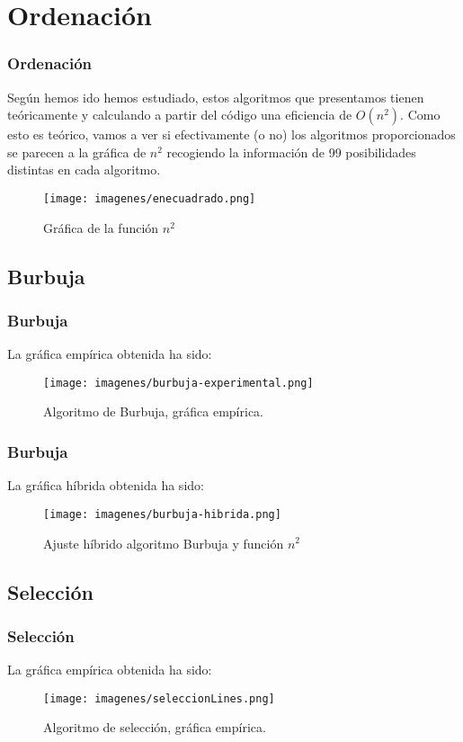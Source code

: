 \documentclass{beamer}
\begin{document}
\section{Ordenación} %
\begin{frame}
	\frametitle{Ordenación}
	Según hemos ido hemos estudiado, estos algoritmos que presentamos tienen teóricamente y calculando a partir del código una eficiencia de $O(n^2 )$. Como esto es teórico, vamos a ver si efectivamente (o no) los algoritmos proporcionados se parecen a la gráfica de $n^2$ recogiendo la información de 99 posibilidades distintas en cada algoritmo.
	\begin{figure}
		\centering
		\texttt{[image: imagenes/enecuadrado.png]}
		\caption{Gráfica de la función $n^2$}
		\label{fig:E1}
	\end{figure}

\end{frame}

\subsection{Burbuja}
\begin{frame}
	\frametitle{Burbuja}
	La gráfica empírica obtenida ha sido:
	\begin{figure}
		\centering
		\texttt{[image: imagenes/burbuja-experimental.png]}
		\caption{Algoritmo de Burbuja, gráfica empírica.}
		\label{fig:E2}
	\end{figure}
	
\end{frame}

\begin{frame}
	\frametitle{Burbuja}
	La gráfica híbrida obtenida ha sido:
	\begin{figure}
		\centering
		\texttt{[image: imagenes/burbuja-hibrida.png]}
		\caption{Ajuste híbrido algoritmo Burbuja y función $n^2$}
		\label{fig:E3}
	\end{figure}	
\end{frame}





\subsection{Selección}
\begin{frame}
	\frametitle{Selección}
	La gráfica empírica obtenida ha sido:
	\begin{figure}
		\centering
		\texttt{[image: imagenes/seleccionLines.png]}
		\caption{Algoritmo de selección, gráfica empírica. }
		\label{fig:E4}
	\end{figure}
	
\end{frame}
\end{document}
